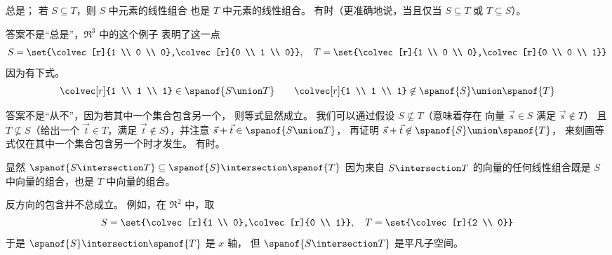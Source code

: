     \begin{answer}
      \begin{exparts}
         \partsitem 总是；
           若 \( S\subseteq T \)，则 \( S \) 中元素的线性组合
           也是 \( T \) 中元素的线性组合。
         \partsitem 有时（更准确地说，当且仅当 
           \( S\subseteq T \) 或 \( T\subseteq S \)）。

           答案不是“总是”，\( \Re^3 \) 中的这个例子
           表明了这一点
           \begin{equation*}
             S=\set{\colvec[r]{1 \\ 0 \\ 0},\colvec[r]{0 \\ 1 \\ 0}},\quad
             T=\set{\colvec[r]{1 \\ 0 \\ 0},\colvec[r]{0 \\ 0 \\ 1}}
           \end{equation*}
           因为有下式。
           \begin{equation*}
             \colvec[r]{1 \\ 1 \\ 1}\in\spanof{S\union T}
             \qquad
             \colvec[r]{1 \\ 1 \\ 1}\not\in\spanof{S}\union \spanof{T}
           \end{equation*}

           答案不是“从不”，因为若其中一个集合包含另一个，
           则等式显然成立。
           我们可以通过假设 \( S\not\subseteq T \)（意味着存在
           向量 \( \vec{s}\in S \) 满足 
           \( \vec{s}\not\in T \)）
           且 \( T\not\subseteq S \)（给出一个 \( \vec{t}\in T \)，满足
           \( \vec{t}\not\in S \)），并注意
           \( \vec{s}+\vec{t}\in\spanof{S\union T} \)，
           再证明 
           \( \vec{s}+\vec{t}\not\in\spanof{S}\union\spanof{T} \)，
           来刻画等式仅在其中一个集合包含另一个时才发生。
         \partsitem 有时。

           显然
           \( \spanof{S\intersection T}
             \subseteq\spanof{S}\intersection\spanof{T} \)
           因为来自 
           \( S\intersection T \)
           的向量的任何线性组合既是 \( S \) 中向量的组合，也是
           \( T \) 中向量的组合。

           反方向的包含并不总成立。
           例如，在 \( \Re^2 \) 中，取
           \begin{equation*}
             S=\set{\colvec[r]{1 \\ 0},\colvec[r]{0 \\ 1}},\quad
             T=\set{\colvec[r]{2 \\ 0}}
           \end{equation*}
           于是 \( \spanof{S}\intersection\spanof{T} \) 是 \( x \) 轴，
           但 \( \spanof{S\intersection T}  \) 是平凡子空间。


\end{exparts}
\end{answer}
